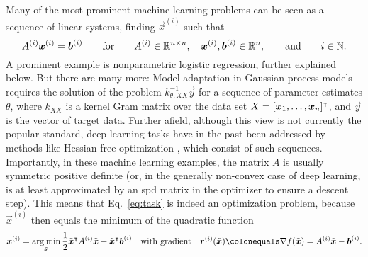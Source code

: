 \documentclass{article}
\begin{document}
Many of the most prominent machine learning problems can be seen as a sequence of linear systems, finding $\vec{x}^{(i)}$ such that 
\begin{equation}\label{eq:task}
A^{(i)} \boldsymbol{x}^{(i)} = \boldsymbol{b}^{(i)}\qquad \text{for}\qquad A^{(i)}\in\mathbb{R}^{n\times n},\quad \boldsymbol{x}^{(i)},\boldsymbol{b}^{(i)}\in\mathbb{R}^{n}, \qquad\text{and}\qquad i\in\mathbb{N}.	
\end{equation}
A prominent example is nonparametric logistic regression, further explained below. But there are many more: Model adaptation in Gaussian process models \citep[][]{RW-GPML} requires the solution of the problem $k_{\theta,XX}^{-1}\vec{y}$ for a sequence of parameter estimates $\theta$, where $k_{XX}$ is a kernel Gram matrix over the data set $X=[\boldsymbol{x}_1,\dots,\boldsymbol{x}_n]^{\intercal}$, and $\vec{y}$ is the vector of target data. Further afield, although this view is not currently the popular standard, deep learning tasks have in the past been addressed by methods like Hessian-free optimization \cite{martens10}, which consist of such sequences. Importantly, in these machine learning examples, the matrix $A$ is usually symmetric positive definite (or, in the generally non-convex case of deep learning, is at least approximated by an spd matrix in the optimizer to ensure a descent step). This means that Eq.~\eqref{eq:task} is indeed an optimization problem, because $\vec{x}^{(i)}$ then equals the minimum of the quadratic function 
\begin{equation}\label{eq:optimization-form}
	\vec{x}^{(i)} = \argmin_{\tilde{\vec{x}}} \frac{1}{2} \tilde{\vec{x}}\Trans A^{(i)} \tilde{\vec{x}} - \tilde{\vec{x}}\Trans \vec{b}^{(i)} \q\text{with gradient}\q \vec{r}^{(i)}(\tilde{\vec{x}}) \ce \nabla f(\tilde{\vec{x}}) = A^{(i)} \tilde{\vec{x}} - \vec{b}^{(i)}.
\end{equation}
\end{document}
